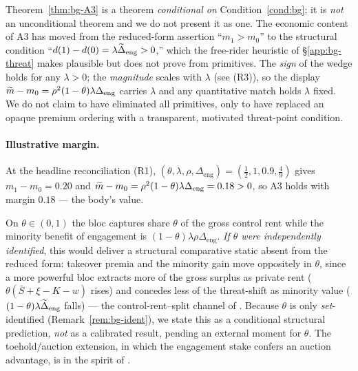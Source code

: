 \begin{remark}
\label{rem:bg-A3honest}
Theorem~\ref{thm:bg-A3} is a theorem \emph{conditional on}
Condition~\ref{cond:bg}; it is \emph{not} an unconditional theorem and we do not
present it as one. The economic content of A3 has moved from the reduced-form
assertion ``$m_{1}>m_{0}$'' to the structural condition
``$d(1)-d(0)=\lambda\widetilde{\Delta}_{\mathrm{eng}}>0$,'' which the free-rider heuristic of
\S\ref{app:bg-threat} makes plausible but does not prove from primitives. The
\emph{sign} of the wedge holds for any $\lambda>0$; the \emph{magnitude} scales
with $\lambda$ (see (R3)), so the display
$\widetilde{m}-m_{0}=\rho^{2}(1-\theta)\lambda\Delta_{\mathrm{eng}}$ carries $\lambda$ and
any quantitative match holds $\lambda$ fixed. We do not claim to have eliminated
all primitives, only to have replaced an opaque premium ordering with a
transparent, motivated threat-point condition.
\end{remark}

\paragraph{Illustrative margin.}
At the headline reconciliation (R1), $(\theta,\lambda,\rho,\Delta_{\mathrm{eng}})=
(\tfrac12,1,0.9,\tfrac49)$ gives $m_{1}-m_{0}=0.20$ and
$\widetilde{m}-m_{0}=\rho^{2}(1-\theta)\lambda\Delta_{\mathrm{eng}}=0.18>0$, so A3 holds
with margin $0.18$ --- the body's value.

\begin{remark}
\label{rem:bg-thetadomain}
On $\theta\in(0,1)$ the bloc captures share $\theta$ of the gross control rent
while the minority benefit of engagement is $(1-\theta)\lambda\rho
\Delta_{\mathrm{eng}}$. \emph{If $\theta$ were independently identified}, this
would deliver a structural comparative static absent from the reduced form:
takeover premia and the minority gain move oppositely in $\theta$, since a more
powerful bloc extracts more of the gross surplus as private rent
($\theta(\bar S+\xi-K-w)$ rises) and concedes less of the threat-shift as minority
value ($(1-\theta)\lambda\widetilde{\Delta}_{\mathrm{eng}}$ falls) --- the control-rent--split
channel of \citet{GrossmanHart1980}. Because $\theta$ is only \emph{set}-identified
(Remark~\ref{rem:bg-ident}), we state this as a conditional structural prediction,
\emph{not} as a calibrated result, pending an external moment for $\theta$. The
toehold/auction extension, in which the engagement stake confers an auction
advantage, is in the spirit of \citet{BulowHuangKlemperer1999}.
\end{remark}

